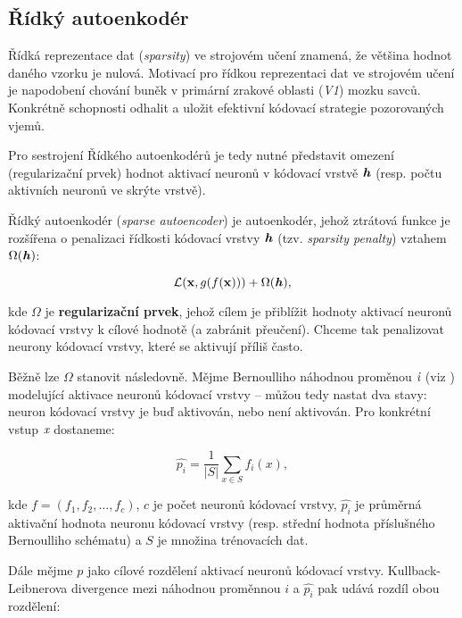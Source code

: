 \subsection{Řídký autoenkodér}
\label{sec:sparse_autoencoder}
Řídká reprezentace dat (\emph{sparsity}) ve strojovém učení znamená, že většina hodnot daného vzorku je nulová. 
Motivací pro řídkou reprezentaci dat ve strojovém učení je napodobení chování buněk v primární zrakové oblasti (\emph{V1}) mozku savců.
Konkrétně schopnosti odhalit a uložit efektivní kódovací strategie pozorovaných vjemů. \cite{Olshausen1997}

Pro sestrojení Řídkého autoenkodérů je tedy nutné představit omezení (regularizační prvek) hodnot aktivací neuronů v kódovací vrstvě $\textbf{\emph{h}}$ (resp. počtu aktivních neuronů ve skrýte vrstvě).

Řídký autoenkodér (\emph{sparse autoencoder}) je autoenkodér, jehož ztrátová funkce je rozšířena o penalizaci řídkosti kódovací vrstvy $\textbf{\emph{h}}$ (tzv. \emph{sparsity penalty}) vztahem $\Omega(\textbf{\emph{h}})$:

\begin{equation}
    \mathcal{L}(\mathbf{x}, g(f(\mathbf{x}))) + \Omega(\textbf{\emph{h}}),
\end{equation}

kde $\Omega$ je \textbf{regularizační prvek}, jehož cílem je přiblížit hodnoty aktivací neuronů kódovací vrstvy k cílové hodnotě (a zabránit přeučení).
Chceme tak penalizovat neurony kódovací vrstvy, které se aktivují příliš často. \cite{Goodfellow2016}

Běžně lze $\Omega$ stanovit následovně. Mějme Bernoulliho náhodnou proměnou $\emph{i}$ (viz \textcite{Goodfellow2016}) modelující aktivace neuronů kódovací  vrstvy – můžou tedy nastat dva stavy: neuron kódovací vrstvy je buď aktivován, nebo není aktivován.
Pro konkrétní vstup $\emph{x}$ dostaneme:

\begin{equation}
    \hat{p_i} = \frac{1}{|S|}\sum_{x \in S}^{}f_i(x),
\end{equation}

kde $ f = (f_1, f_2, \dots, f_c)$, $c$ je počet neuronů kódovací  vrstvy, $\hat{p_i}$ je průměrná aktivační hodnota neuronu kódovací vrstvy (resp. střední hodnota příslušného Bernoulliho schématu) a $S$ je množina trénovacích dat. \cite{Charte2018}

Dále mějme $p$ jako cílové rozdělení aktivací neuronů kódovací vrstvy.
Kullback-Leibnerova divergence mezi náhodnou proměnnou $i$ a $\hat{p_i}$ pak udává rozdíl obou rozdělení:

